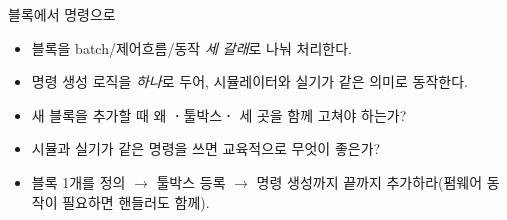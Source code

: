 \begin{teachbox}{블록에서 명령으로}
\begin{itemize}
  \item 블록을 batch/제어흐름/동작 \emph{세 갈래}로 나눠 처리한다.
  \item 명령 생성 로직을 \emph{하나}로 두어, 시뮬레이터와 실기가 같은 의미로 동작한다.
\end{itemize}
\begin{itemize}
  \item 새 블록을 추가할 때 왜 \textbf{·}툴박스\textbf{·} 세 곳을 함께 고쳐야 하는가?
  \item 시뮬과 실기가 같은 명령을 쓰면 교육적으로 무엇이 좋은가?
\end{itemize}
\begin{itemize}
  \item 블록 1개를 정의 $\to$ 툴박스 등록 $\to$ 명령 생성까지 끝까지 추가하라(펌웨어 동작이 필요하면 핸들러도 함께).
\end{itemize}
\end{teachbox}

